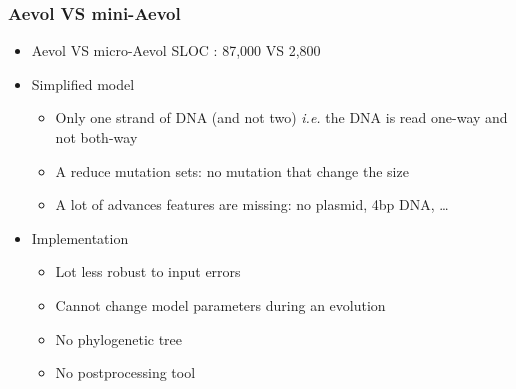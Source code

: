 \documentclass{beamer}
\begin{document}
\begin{frame}
 \frametitle{Aevol VS mini-Aevol}
 \begin{itemize}
  \item Aevol VS micro-Aevol SLOC : 87,000 VS 2,800
  \vfill
  \item Simplified model
  \begin{itemize}
  \item Only one strand of DNA (and not two) \textit{i.e.} the DNA is read one-way and not both-way
  \item A reduce mutation sets: no mutation that change the size
  \item A lot of advances features are missing: no plasmid, 4bp DNA, \ldots
  \end{itemize}
  \vfill
  \item Implementation
  \begin{itemize}
   \item Lot less robust to input errors
   \item Cannot change model parameters during an evolution
   \item No phylogenetic tree
   \item No postprocessing tool
  \end{itemize}
 \end{itemize}
\end{frame}


%  
\end{document}
